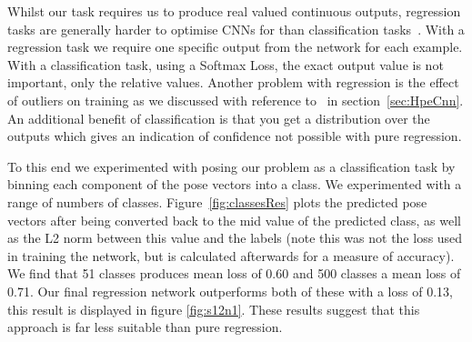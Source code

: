 \documentclass[11pt]{article} %
\begin{document}
Whilst our task requires us to produce real valued continuous outputs, regression tasks are generally harder to optimise CNNs for than classification tasks~\cite{KarLects}. With a regression task we require one specific output from the network for each example. With a classification task, using a Softmax Loss, the exact output value is not important, only the relative values. Another problem with regression is the effect of outliers on training as we discussed with reference to~\cite{Belagiannis} in section~\ref{sec:HpeCnn}. An additional benefit of classification is that you get a distribution over the outputs which gives an indication of confidence not possible with pure regression. 

To this end we experimented with posing our problem as a classification task by binning each component of the pose vectors into a class. We experimented with a range of numbers of classes. Figure~\ref{fig:classesRes} plots the predicted pose vectors after being converted back to the mid value of the predicted class, as well as the L2 norm between this value and the labels (note this was not the loss used in training the network, but is calculated afterwards for a measure of accuracy). We find that 51 classes produces mean loss of 0.60 and 500 classes a mean loss of 0.71. Our final regression network outperforms both of these with a loss of 0.13, this result is displayed in figure \ref{fig:s12n1}. These results suggest that this approach is far less suitable than pure regression.
\end{document}
